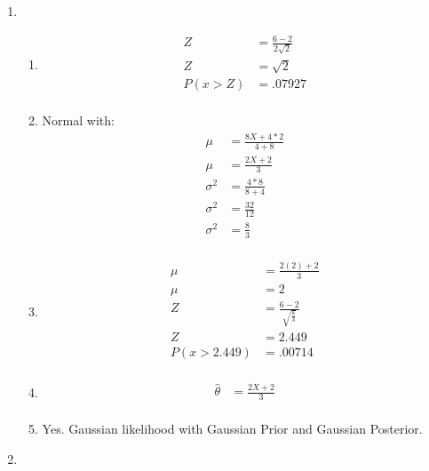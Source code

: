 \documentclass{article}
\begin{document}

\begin{enumerate}
\item
	\begin{enumerate}
	\item
		\begin{equation*}
		\begin{split}
		Z & = \frac{6-2}{2\sqrt{2}}  \\
		Z & = \sqrt{2} \\
		P(x > Z) & = .07927 \\
		\end{split}
		\end{equation*}
	\item
		Normal with:
		\begin{equation*}
		\begin{split}
		\mu & = \frac{8X+4*2}{4+8} \\
		\mu & = \frac{2X+2}{3} \\
		\sigma^{2} & = \frac{4*8}{8+4} \\
		\sigma^{2} & = \frac{32}{12} \\
		\sigma^{2} & = \frac{8}{3} \\
		\end{split}
		\end{equation*}
	\item
		\begin{equation*}
		\begin{split}
		\mu & = \frac{2(2)+2}{3} \\
		\mu & = 2 \\
		Z & = \frac{6 - 2}{\sqrt{\frac{8}{3}}} \\
		Z & = 2.449 \\
		P(x > 2.449) & = .00714 \\
		\end{split}
		\end{equation*}
	\item
		\begin{equation*}
		\begin{split}
		\hat{\theta} & = \frac{2X+2}{3} \\
		\end{split}
		\end{equation*}
	\item
		Yes. Gaussian likelihood with Gaussian Prior and Gaussian Posterior.
	\end{enumerate}
\item

\end{enumerate}
\end{document}
